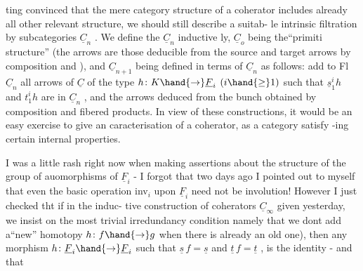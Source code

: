 ting convinced that the mere category structure of a coherator includes
already all other relevant structure, we should still describe a suitab-%
le intrinsic filtration by subcategories $\underline{C}_n$ . We define the $\underline{C}_n$ inductive%
ly, $\underline{C}_o$ being the``primiti structure'' (the arrows are those deducible
from the source and target arrows by composition and ), and
$\underline{C}_{n+1}$ being defined in terms of $\underline{C}_n$ as follows: add to Fl $\underline{C}_n$ all arrows 
of $\underline{C}$ of the type $h\colon K\hand{\to} \underline{F}_i$ $(i\hand{\geq} 1)$ such that $\underline{s}^i_1 h$ and $t^i_1 h$ are in $\underline{C}_n$ , and
the arrows deduced from the bunch obtained  by composition and
fibered products. In view of these constructions, it would be an easy
exercise to give an  caracterisation of a coherator, as a category satisfy
-ing certain internal properties.

I was a little rash right now when making assertions about the
structure of the group of auomorphisms of $\underline{F}_i$ - I forgot that two days
ago I pointed out to myself that even the basic operation inv$_i$ upon $\underline{F}_i$
need not  be  involution! However I just checked tht if in the induc-%
tive construction of coherators $\underline{C}_{\infty}$ given yesterday, we insist on the
most trivial irredundancy condition \hand{(} namely that we dont add a``new''
homotopy $h\colon f\hand{\to} g$ when there is already an old one), then any morphism
$h\colon \underline{F}_i\hand{\to} \underline{F}_i$ such that $\underline{s}\, f=\underline{s}$ and $\underline{t}\, f=\underline{t}$ , is the identity - and that

